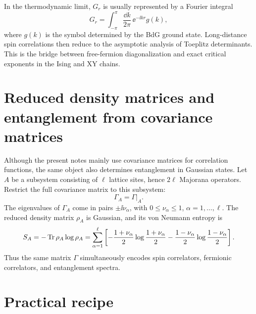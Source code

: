 \begin{remark}
In the thermodynamic limit, $G_r$ is usually represented by a Fourier integral
\begin{equation}
    G_r=\int_{-\pi}^{\pi}\frac{\dd k}{2\pi}\,\ee^{-\ii kr}g(k),
\end{equation}
where $g(k)$ is the symbol determined by the BdG ground state.  Long-distance
spin correlations then reduce to the asymptotic analysis of Toeplitz
determinants.  This is the bridge between free-fermion diagonalization and exact
critical exponents in the Ising and XY chains.
\end{remark}

\section[Entanglement from covariance matrices]{Reduced density matrices and entanglement from covariance matrices}
\label{sec:entanglement-from-covariance-matrix}

Although the present notes mainly use covariance matrices for correlation
functions, the same object also determines entanglement in Gaussian states.  Let
$A$ be a subsystem consisting of $\ell$ lattice sites, hence $2\ell$ Majorana
operators.  Restrict the full covariance matrix to this subsystem:
\begin{equation}
    \Gamma_A=\Gamma|_A.
\end{equation}
The eigenvalues of $\Gamma_A$ come in pairs $\pm\ii\nu_\alpha$, with
$0\leq\nu_\alpha\leq1$, $\alpha=1,\ldots,\ell$.  The reduced density matrix
$\rho_A$ is Gaussian, and its von Neumann entropy is
\begin{equation}
\label{eq:gaussian-entanglement-entropy}
    S_A
    =
    -\operatorname{Tr} \rho_A\log\rho_A
    =
    \sum_{\alpha=1}^{\ell}
    \left[
    -\frac{1+\nu_\alpha}{2}\log\frac{1+\nu_\alpha}{2}
    -\frac{1-\nu_\alpha}{2}\log\frac{1-\nu_\alpha}{2}
    \right].
\end{equation}
Thus the same matrix $\Gamma$ simultaneously encodes spin correlators,
fermionic correlators, and entanglement spectra.

\section{Practical recipe}
\label{sec:correlation-functions-practical-recipe}

